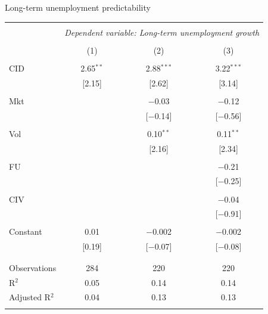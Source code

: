 \documentclass{beamer}
\begin{document}
\scriptsize
\begin{frame}{Long-term unemployment predictability}
\begin{table}[!htbp] \centering 
  \label{} 
\begin{tabular}{@{\extracolsep{5pt}}lccc} 
\\[-1.8ex]\hline 
\hline \\[-1.8ex] 
 & \multicolumn{3}{c}{\textit{Dependent variable: Long-term unemployment growth}} \\ 
\cline{2-4} 
\\[-1.8ex] & (1) & (2) & (3)\\ 
\hline \\[-1.8ex] 
 CID & 2.65$^{**}$ & 2.88$^{***}$ & 3.22$^{***}$ \\ 
  & [2.15] & [2.62] & [3.14] \\ 
  & & & \\ 
 Mkt &  & $-$0.03 & $-$0.12 \\ 
  &  & [$-$0.14] & [$-$0.56] \\ 
  & & & \\ 
 Vol &  & 0.10$^{**}$ & 0.11$^{**}$ \\ 
  &  & [2.16] & [2.34] \\ 
  & & & \\ 
 FU &  &  & $-$0.21 \\ 
  &  &  & [$-$0.25] \\ 
  & & & \\ 
 CIV &  &  & $-$0.04 \\ 
  &  &  & [$-$0.91] \\ 
  & & & \\ 
 Constant & 0.01 & $-$0.002 & $-$0.002 \\ 
  & [0.19] & [$-$0.07] & [$-$0.08] \\ 
  & & & \\ 
\hline \\[-1.8ex] 
Observations & 284 & 220 & 220 \\ 
R$^{2}$ & 0.05 & 0.14 & 0.14 \\ 
Adjusted R$^{2}$ & 0.04 & 0.13 & 0.13 \\ 
\hline 
\hline \\[-1.8ex] 
\end{tabular} 
\end{table}
\end{frame}
\end{document}
